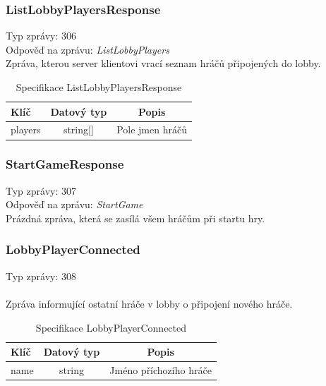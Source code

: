 \documentclass[12pt, a4paper]{article}
\begin{document}
    \subsubsection*{ListLobbyPlayersResponse}
    Typ zprávy: 306\\
    Odpověď na zprávu: \textit{ListLobbyPlayers}\\

    Zpráva, kterou server klientovi vrací seznam hráčů připojených do lobby.

    \begin{table}[H]
        \centering
        \begin{tabular}{|l|c|c|}
            \hline
            Klíč & Datový typ & Popis\\
            \hline
            \hline
            players & string[] & Pole jmen hráčů\\
            \hline
        \end{tabular}
        \caption{Specifikace ListLobbyPlayersResponse}
    \end{table}

    \subsubsection*{StartGameResponse}
    Typ zprávy: 307\\
    Odpověď na zprávu: \textit{StartGame}\\

    Prázdná zpráva, která se zasílá všem hráčům při startu hry.

    \subsubsection*{LobbyPlayerConnected}
    Typ zprávy: 308\\\\
    Zpráva informující ostatní hráče v lobby o připojení nového hráče.

    \begin{table}[H]
        \centering
        \begin{tabular}{|l|c|c|}
            \hline
            Klíč & Datový typ & Popis\\
            \hline
            \hline
            name & string & Jméno příchozího hráče\\
            \hline
        \end{tabular}
        \caption{Specifikace LobbyPlayerConnected}
    \end{table}
\end{document}
